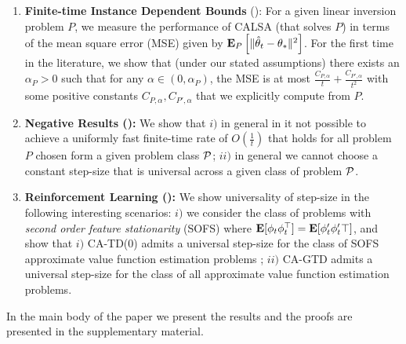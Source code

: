 \begin{enumerate}[leftmargin=*]%
\item \textbf{Finite-time Instance Dependent Bounds} (): For a given linear inversion problem $P$, we measure the performance of CALSA (that solves $P$) in terms of the mean square error (MSE) given by $\EEP{\normsm{\thh_t-\ts}^2}$.
For the first time in the literature,
we show that (under our stated assumptions) there exists an $\alpha_P>0$ such that 
for any $\alpha\in (0,\alpha_P)$,
the MSE %
is at most $\frac{C_{P,\alpha}}{t}+\frac{C_{P',\alpha}}{t^2}$ with some positive constants $C_{P,\alpha},C_{P',\alpha}$ that we explicitly compute from $P$.
\item \textbf{Negative Results ():} We show that $i)$ in general in it not possible to achieve a uniformly fast finite-time rate of $O(\frac{1}{t})$ that holds for all problem $P$ chosen form a given problem class $\P$; $ii)$ in general we cannot choose a constant step-size that is universal across a given class of problem $\P$.
\item \textbf{Reinforcement Learning ():} We show universality of step-size in the following interesting scenarios: $i)$ we consider the class of problems with \emph{second order feature stationarity} (SOFS) where $\E[{\phi_t\phi_t^\top}]=\E[{\phi'_t\phi'_t\top}]$, and show that $i)$ CA-TD(0) admits a universal step-size for the class of SOFS approximate value function estimation problems ; $ii)$ CA-GTD admits a universal step-size for the class of all approximate value function estimation problems.
\end{enumerate}
In the main body of the paper we present the results and the proofs are presented in the supplementary material.
